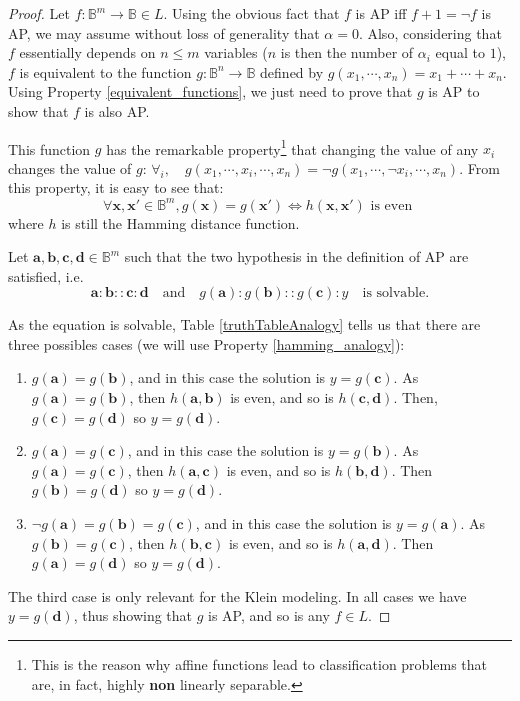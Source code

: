\begin{proof}
Let $f \colon \mathbb{B}^m \to \mathbb{B} \in L$. Using the obvious fact that
  $f$ is AP  iff $f + 1 = \neg f$ is AP, we may assume without loss of generality that
  $\alpha = 0$. Also, considering that $f$ essentially depends on $n \leq m$
  variables ($n$ is then the number of $\alpha_i$ equal to $1$), $f$ is
  equivalent to the function $g \colon \mathbb{B}^n \to \mathbb{B}$ defined by
  $g(x_1, \cdots, x_n) = x_1 +  \cdots + x_n$. Using Property
  \ref{equivalent_functions}, we just need to prove that $g$ is AP to show that
  $f$ is also AP.

  This function $g$ has the remarkable property\footnote{This is the reason why affine
  functions lead to classification problems that are, in fact, highly
  \textbf{non} linearly separable.} that changing the value of any
  $x_i$ changes the value of $g$: $\forall _i, \quad g(x_1, \cdots, x_i, \cdots, x_n) =
  \neg g(x_1, \cdots, \neg x_i, \cdots, x_n)$. From this property, it is easy to
  see that:
  $$\forall \mathbf{x}, \mathbf{x}' \in \mathbb{B}^m, g(\mathbf{x}) =
  g(\mathbf{x}') \iff h(\mathbf{x}, \mathbf{x}') \text{ is even }$$
  where $h$ is still the Hamming distance function.

  Let $\mathbf{a}, \mathbf{b}, \mathbf{c}, \mathbf{d} \in \mathbb{B}^m$  such
  that the two hypothesis in the definition of AP are satisfied, i.e.
  $$
  \mathbf{a} : \mathbf{b} :: \mathbf{c} : \mathbf{d}\quad \text{and}\quad
  g(\mathbf{a}) : g(\mathbf{b}) :: g(\mathbf{c}) : y\quad  \text{is  solvable}.
  $$

  As the equation is solvable, Table \ref{truthTableAnalogy} tells us that
  there are three possibles cases (we will use Property
  \ref{hamming_analogy}):
  \begin{enumerate}
    \item $g(\mathbf{a}) = g(\mathbf{b})$, and in this case the solution is
      $y = g(\mathbf{c})$. As $g(\mathbf{a}) = g(\mathbf{b})$, then
      $h(\mathbf{a}, \mathbf{b})$ is even, and so is $h(\mathbf{c},
      \mathbf{d})$. Then, $g(\mathbf{c}) = g(\mathbf{d})$ so $y = g(\mathbf{d})$.
    \item $g(\mathbf{a}) = g(\mathbf{c})$, and in this case the solution is $y =
      g(\mathbf{b})$. As $g(\mathbf{a}) = g(\mathbf{c})$, then
      $h(\mathbf{a}, \mathbf{c})$ is even, and so is $h(\mathbf{b},
      \mathbf{d})$. Then $g(\mathbf{b}) = g(\mathbf{d})$ so $y =
      g(\mathbf{d})$.
    \item $\neg g(\mathbf{a}) = g(\mathbf{b}) = g(\mathbf{c})$, and in this
      case the solution is $y = g(\mathbf{a})$. As $g(\mathbf{b}) =
      g(\mathbf{c})$, then $h(\mathbf{b}, \mathbf{c})$ is even, and so is
      $h(\mathbf{a}, \mathbf{d})$. Then $g(\mathbf{a}) = g(\mathbf{d})$ so $y =
      g(\mathbf{d})$.
  \end{enumerate}

  The third case is only relevant for the Klein modeling. In all cases we have
  $y = g(\mathbf{d})$, thus showing that $g$ is AP, and so is any $f \in L$.
\end{proof}


